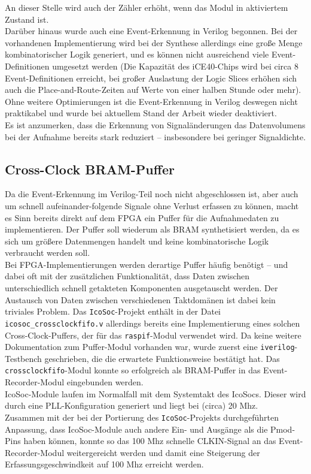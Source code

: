 {\begin{verbatim}
\end{verbatim}
An dieser Stelle wird auch der Zähler erhöht, wenn das Modul in aktiviertem Zustand ist.\\
Darüber hinaus wurde auch eine Event-Erkennung in Verilog begonnen. Bei der vorhandenen Implementierung wird bei der Synthese allerdings eine große Menge kombinatorischer Logik generiert, und es können nicht ausreichend viele Event-Definitionen umgesetzt werden (Die Kapazität des iCE40-Chips wird bei circa 8 Event-Definitionen erreicht, bei großer Auslastung der Logic Slices erhöhen sich auch die Place-and-Route-Zeiten auf Werte von einer halben Stunde oder mehr). \\
Ohne weitere Optimierungen ist die Event-Erkennung in Verilog deswegen nicht praktikabel und wurde bei aktuellem Stand der Arbeit wieder deaktiviert.\\
Es ist anzumerken, dass die Erkennung von Signaländerungen das Datenvolumens bei der Aufnahme bereits stark reduziert -- insbesondere bei geringer Signaldichte.

\subsection{Cross-Clock BRAM-Puffer}

Da die Event-Erkennung im Verilog-Teil noch nicht abgeschlossen ist, aber auch um schnell aufeinander-folgende Signale ohne Verlust erfassen zu können, macht es Sinn bereits direkt auf dem FPGA ein Puffer für die Aufnahmedaten zu implementieren. Der Puffer soll wiederum als BRAM synthetisiert werden, da es sich um größere Datenmengen handelt und keine kombinatorische Logik verbraucht werden soll.\\
Bei FPGA-Implementierungen werden derartige Puffer häufig benötigt -- und dabei oft mit der zusätzlichen Funktionalität, dass Daten zwischen unterschiedlich schnell getakteten Komponenten ausgetauscht werden. Der Austausch von Daten zwischen verschiedenen Taktdomänen ist dabei kein triviales Problem. Das {\tt IcoSoc}-Projekt enthält in der Datei {\tt icosoc\_crossclockfifo.v} allerdings bereits eine Implementierung eines solchen Cross-Clock-Puffers, der für das {\tt raspif}-Modul verwendet wird. Da keine weitere Dokumentation zum Puffer-Modul vorhanden war, wurde zuerst eine {\tt iverilog}-Testbench geschrieben, die die erwartete Funktionsweise bestätigt hat. Das {\tt crossclockfifo}-Modul konnte so erfolgreich als BRAM-Puffer in das Event-Recorder-Modul eingebunden werden.\\
IcoSoc-Module laufen im Normalfall mit dem Systemtakt des IcoSocs. Dieser wird durch eine PLL-Konfiguration generiert und liegt bei (circa) 20 Mhz.\\
Zusammen mit der bei der Portierung des {\tt IcoSoc}-Projekts durchgeführten Anpassung, dass IcoSoc-Module auch andere Ein- und Ausgänge als die Pmod-Pins haben können, konnte so das 100 Mhz schnelle CLKIN-Signal an das Event-Recorder-Modul weitergereicht werden und damit eine Steigerung der Erfassungsgeschwindkeit auf 100 Mhz erreicht werden.  

}
